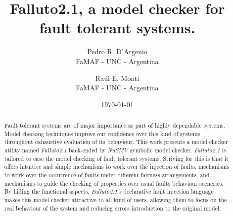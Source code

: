\documentclass[12pt]{article}
\title{Falluto2.1, a model checker for fault tolerant systems.}
\author{ Pedro R. D'Argenio\\ FaMAF - UNC - Argentina \and Ra\'ul E. Monti\\
	 FaMAF - UNC - Argentina
}
\date{\today}
\begin{document}
\maketitle
\begin{abstract}
Fault tolerant systems are of major importance as part of highly dependable 
systems. Model checking techniques improve our confidence over this kind of
systems throughout exhaustive evaluation of its behaviour. This work presents
a model checker utility named \mbox{\textit{Falluto2.1}} back-ended by 
\mbox{\textit{NuSMV}} symbolic model checker. \mbox{\textit{Falluto2.1}} is
tailored to ease the model checking of fault tolerant systems. Striving for
this is that it offers intuitive and simple mechanisms to work over the 
injection of faults, mechanisms to work over the occurrence of faults under
different fairness arrangements, and mechanisms to guide the checking of 
properties over usual faults behaviour sceneries. By hiding the functional
aspects, \mbox{\textit{Falluto2.1's}} declarative fault injection language
makes this model checker attractive to all kind of users, allowing them to
focus on the real behaviour of the system and reducing errors introduction
to the original model.
\end{abstract}


\end{document}
